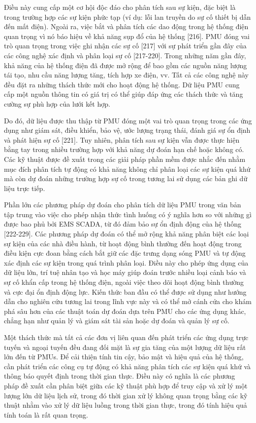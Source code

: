 \documentclass[utf8]{frontiersSCNS} %
\begin{document}
Điều này cung cấp một cơ hội độc đáo cho phân tích sau sự kiện, đặc biệt là trong trường hợp các sự kiện phức tạp (ví dụ: lỗi lan truyền do sự cố thiết bị dẫn đến mất điện). Ngoài ra, việc bắt và phân tích các dao động trong hệ thống điện quan trọng vì nó báo hiệu về khả năng sụp đổ của hệ thống [216]. PMU đóng vai trò quan trọng trong việc ghi nhận các sự cố [217] với sự phát triển gần đây của các công nghệ xác định và phân loại sự cố [217-220]. Trong những năm gần đây, khả năng của hệ thống điện đã được mở rộng để bao gồm các nguồn năng lượng tái tạo, nhu cầu năng lượng tăng, tích hợp xe điện, vv. Tất cả các công nghệ này đều đặt ra những thách thức mới cho hoạt động hệ thống. Dữ liệu PMU cung cấp một nguồn thông tin có giá trị có thể giúp đáp ứng các thách thức và tăng cường sự phù hợp của lưới kết hợp.

Do đó, dữ liệu được thu thập từ PMU đóng một vai trò quan trọng trong các ứng dụng như giám sát, điều khiển, bảo vệ, ước lượng trạng thái, đánh giá sự ổn định và phát hiện sự cố [221]. Tuy nhiên, phân tích sau sự kiện vẫn được thực hiện bằng tay trong nhiều trường hợp với khả năng dự đoán hạn chế hoặc không có. Các kỹ thuật được đề xuất trong các giải pháp phần mềm được nhắc đến nhằm mục đích phân tích tự động có khả năng không chỉ phân loại các sự kiện quá khứ mà còn dự đoán những trường hợp sự cố trong tương lai sử dụng các bản ghi dữ liệu trực tiếp.

Phần lớn các phương pháp dự đoán cho phân tích dữ liệu PMU trong văn bản tập trung vào việc cho phép nhận thức tình huống có ý nghĩa hơn so với những gì được bao phủ bởi EMS SCADA, từ đó đảm bảo sự ổn định động của hệ thống [222-229]. Các phương pháp dự đoán có thể mở rộng khả năng phân biệt các loại sự kiện của các nhà điều hành, từ hoạt động bình thường đến hoạt động trong điều kiện cực đoan bằng cách bắt giữ các đặc trưng dạng sóng PMU và tự động xác định các sự kiện trong quá trình phân loại. Điều này cho phép ứng dụng của dữ liệu lớn, trí tuệ nhân tạo và học máy giúp đoán trước nhiều loại cảnh báo và sự cố khẩn cấp trong hệ thống điện, ngoài việc theo dõi hoạt động bình thường và cực đại ổn định động lực. Kiến thức ban đầu có thể được sử dụng như hướng dẫn cho nghiên cứu tương lai trong lĩnh vực này và có thể mở cánh cửa cho khám phá sâu hơn của các thuật toán dự đoán dựa trên PMU cho các ứng dụng khác, chẳng hạn như quản lý và giám sát tài sản hoặc dự đoán và quản lý sự cố.

Một thách thức mà tất cả các đơn vị liên quan đến phát triển các ứng dụng trực tuyến và ngoại tuyến đều đang đối mặt là sự gia tăng của một lượng dữ liệu rất lớn đến từ PMUs. Để cải thiện tính tin cậy, bảo mật và hiệu quả của hệ thống, cần phát triển các công cụ tự động có khả năng phân tích các sự kiện quá khứ và thông báo quyết định trong thời gian thực. Điều này có nghĩa là các phương pháp đề xuất cần phân biệt giữa các kỹ thuật phù hợp để truy cập và xử lý một lượng lớn dữ liệu lịch sử, trong đó thời gian xử lý không quan trọng bằng các kỹ thuật nhằm vào xử lý dữ liệu luồng trong thời gian thực, trong đó tính hiệu quả tính toán là rất quan trọng.
\end{document}
